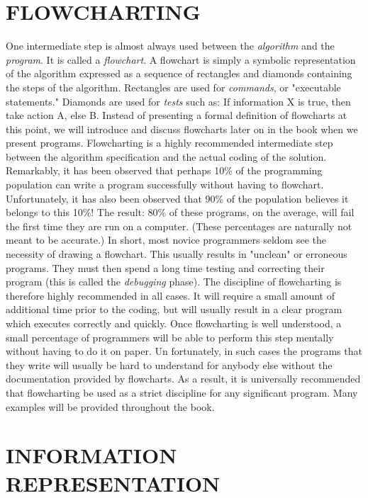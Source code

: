\documentclass{book}
\begin{document}
\section*{FLOWCHARTING}

One intermediate step is almost always used between the
\textit{algorithm} and the \textit{program}. It is called a \textit{flowchart}. A flowchart is
simply a symbolic representation of the algorithm expressed as a
sequence of rectangles and diamonds containing the steps of the
algorithm. Rectangles are used for \textit{commands}, or "executable
statements." Diamonds are used for \textit{tests} such as: If information
X is true, then take action A, else B. Instead of presenting a formal
definition of flowcharts at this point, we will introduce and discuss
flowcharts later on in the book when we present programs.
Flowcharting is a highly recommended intermediate step between the algorithm specification and the actual coding of the solution. Remarkably, it has been observed that perhaps 10\% of the
programming population can write a program successfully without having to flowchart. Unfortunately, it has also been observed
that 90\% of the population believes it belongs to this 10\%! The
result: 80\% of these programs, on the average, will fail the first
time they are run on a computer. (These percentages are naturally
not meant to be accurate.) In short, most novice programmers seldom see the necessity of drawing a flowchart. This usually results
in "unclean" or erroneous programs. They must then spend a long
time testing and correcting their program (this is called the
\textit{debugging} phase). The discipline of flowcharting is therefore
highly recommended in all cases. It will require a small amount of
additional time prior to the coding, but will usually result in a clear
program which executes correctly and quickly. Once flowcharting
is well understood, a small percentage of programmers will be able
to perform this step mentally without having to do it on paper. Un
fortunately, in such cases the programs that they write will usually be hard to understand for anybody else without the documentation provided by flowcharts. As a result, it is universally recommended that flowcharting be used as a strict discipline for any
significant program. Many examples will be provided throughout
the book.

\section*{INFORMATION REPRESENTATION}
\end{document}
